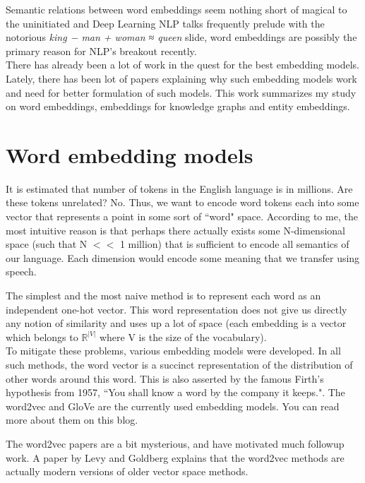 \documentclass[12pt]{article}
\newcommand{\R}{\mathbb{R}}
\begin{document}
Semantic relations between word embeddings seem nothing short of magical to the uninitiated and Deep Learning NLP talks frequently prelude with the notorious \textit{king − man + woman ≈ queen} slide, word embeddings are possibly the primary reason for NLP's breakout recently.\\

There has already been a lot of work in the quest for the best embedding models. Lately,  there has been lot of papers explaining why such embedding models work and need for better formulation of such models. This work summarizes my study on word embeddings, embeddings for knowledge graphs and entity embeddings.

\section{Word embedding models}

It is estimated that number of tokens in the English language is in millions. Are these tokens unrelated? No. Thus, we want to encode word tokens each into some vector that represents a point in some sort of ``word" space. According to me, the most intuitive reason is that perhaps there actually exists some N-dimensional space (such that N $<<$ 1 million) that is sufficient to encode all semantics of our language. Each dimension would encode some meaning that we transfer using speech.\newline

The simplest and the most naive method is to represent each word as an independent one-hot vector. This word representation does not give us directly any notion of similarity and uses up a lot of space (each embedding is a vector which belongs to $\R^{|V|}$ where V is the size of the vocabulary).\\

To mitigate these problems, various embedding models were developed. In all such methods, the word vector is a succinct representation of the distribution of other words around this word. This is also asserted by the famous Firth’s hypothesis from 1957, ``You shall know a word by the company it keeps.". 
The word2vec\cite{DBLP:journals/corr/abs-1301-3781} and GloVe\cite{Pennington14glove:global} are the currently used embedding models. You can read more about them on this blog\cite{ruder_2016}.\newline

The word2vec papers are a bit mysterious, and have motivated much followup work. A paper\cite{NIPS2014_5477} by Levy and Goldberg explains that the word2vec methods are actually modern versions of older vector space methods. \newline
\end{document}
